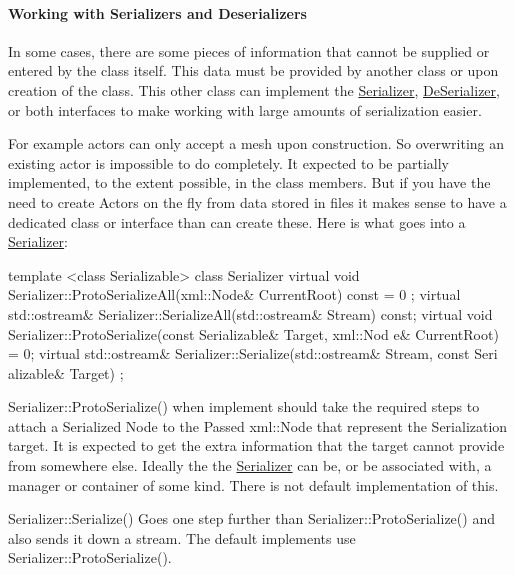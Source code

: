  \par
 \hypertarget{Serialization_serializationserializers}{}\paragraph{Working with Serializers and Deserializers}\label{Serialization_serializationserializers}
In some cases, there are some pieces of information that cannot be supplied or entered by the class itself. This data must be provided by another class or upon creation of the class. This other class can implement the \hyperlink{classMezzanine_1_1Serializer}{Serializer}, \hyperlink{classMezzanine_1_1DeSerializer}{DeSerializer}, or both interfaces to make working with large amounts of serialization easier. \par
 \par
 For example actors can only accept a mesh upon construction. So overwriting an existing actor is impossible to do completely. It expected to be partially implemented, to the extent possible, in the class members. But if you have the need to create Actors on the fly from data stored in files it makes sense to have a dedicated class or interface than can create these. Here is what goes into a \hyperlink{classMezzanine_1_1Serializer}{Serializer}: 
\begin{DoxyCode}
 template <class Serializable> class Serializer
 {
     virtual void Serializer::ProtoSerializeAll(xml::Node& CurrentRoot) const = 0
      ;
     virtual std::ostream& Serializer::SerializeAll(std::ostream& Stream) const;
     virtual void Serializer::ProtoSerialize(const Serializable& Target, xml::Nod
      e& CurrentRoot) = 0;
     virtual std::ostream& Serializer::Serialize(std::ostream& Stream, const Seri
      alizable& Target)
 };
\end{DoxyCode}
 Serializer::ProtoSerialize() when implement should take the required steps to attach a Serialized Node to the Passed xml::Node that represent the Serialization target. It is expected to get the extra information that the target cannot provide from somewhere else. Ideally the the \hyperlink{classMezzanine_1_1Serializer}{Serializer} can be, or be associated with, a manager or container of some kind. There is not default implementation of this. \par
 \par
 Serializer::Serialize() Goes one step further than Serializer::ProtoSerialize() and also sends it down a stream. The default implements use Serializer::ProtoSerialize(). \par
